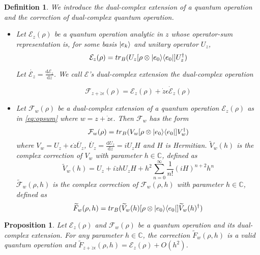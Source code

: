 \documentclass{article}
\newtheorem{definition}[theorem]{Definition}
\newtheorem{proposition}[theorem]{Proposition}
\newcommand{\C}{\mathbb{C}}
\newcommand{\e}{\epsilon}
\newcommand{\E}{\mathcal{E}}
\newcommand{\F}{\mathcal{F}}
\newcommand{\til}{\widetilde}
\newcommand\ketbra[2]{\ket{#1}\!\bra{#2}}
\begin{document}
\begin{definition}
We introduce the dual-complex extension of a quantum operation and the correction of dual-complex quantum operation.
\begin{itemize}
 \item Let $\E_z(\rho)$ be a quantum operation analytic in $z$ whose operator-sum representation is, for some basis $\ket{e_k}$ and unitary operator $U_z$,
\begin{equation}\label{eq:opsum}
\E_z(\rho) = tr_B(U_z [\rho \otimes \ketbra{e_0}{e_0}] U_z^\dagger)
\end{equation}

Let $\dot{\E_z} = \frac{\mathrm{d}\E_z}{\mathrm{d}z}$. We call $\E$'s dual-complex extension the dual-complex operation

\begin{equation}
\F_{z+\dot{z}\e}(\rho) = \E_z(\rho) + \dot{z}\e \dot{\E}_z(\rho)
\end{equation}

 \item Let $\F_w(\rho)$ be a dual-complex extension of a quantum operation $\E_z(\rho)$ as in \ref{eq:opsum} where $w = z + \dot{z}\e$. Then $\F_w$ has the form
        \begin{equation}
        \F_{w}(\rho) = tr_B(V_w [\rho \otimes \ketbra{e_0}{e_0}] V_w^\dagger)
        \end{equation}
  where $V_w = U_z + \e \dot{z} \dot{U_z}$, $\dot{U_z} = \frac{\mathrm{d}U_z}{\mathrm{d}z} = iU_zH$ and $H$ is Hermitian. $\til{V}_w(h)$ is the complex correction of $V_w$ with parameter $h \in \C$, defined as
        \begin{equation}
        \til{V}_w(h) = U_z + i \dot{z} h {U_z} H + h^2\sum_{n=0}^\infty \frac{1}{n!} (iH)^{n+2}h^n
        \end{equation}
  $\til{\F}_w(\rho, h)$ is the complex correction of $\F_w(\rho, h)$ with parameter $h \in \C$, defined as
        \begin{equation}\label{eq:corrF}
        \til{F}_w(\rho, h) = tr_B(\til{V}_w(h) [\rho \otimes \ketbra{e_0}{e_0}] \til{V}_w(h)^\dagger)
        \end{equation}
\end{itemize}

\end{definition}

\begin{proposition}
Let $\E_z(\rho)$ and $\F_w(\rho)$ be a quantum operation and its dual-complex extension. For any parameter $h \in \C$, the correction $\til{F}_w(\rho, h)$ is a valid quantum operation and $\til{F}_{z + \dot{z}\e}(\rho, h) = \E_z(\rho) + O(h^2)$.
\end{proposition}
\end{document}
